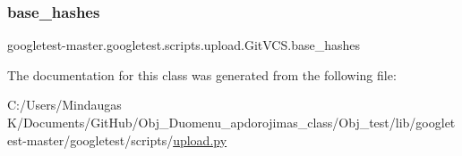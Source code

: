 \subsubsection{\texorpdfstring{base\_hashes}{base\_hashes}}
{\footnotesize\ttfamily googletest-\/master.\+googletest.\+scripts.\+upload.\+Git\+V\+C\+S.\+base\+\_\+hashes}



The documentation for this class was generated from the following file\+:\begin{DoxyCompactItemize}
\item 
C\+:/\+Users/\+Mindaugas K/\+Documents/\+Git\+Hub/\+Obj\+\_\+\+Duomenu\+\_\+apdorojimas\+\_\+class/\+Obj\+\_\+test/lib/googletest-\/master/googletest/scripts/\mbox{\hyperlink{_obj__test_2lib_2googletest-master_2googletest_2scripts_2upload_8py}{upload.\+py}}\end{DoxyCompactItemize}
